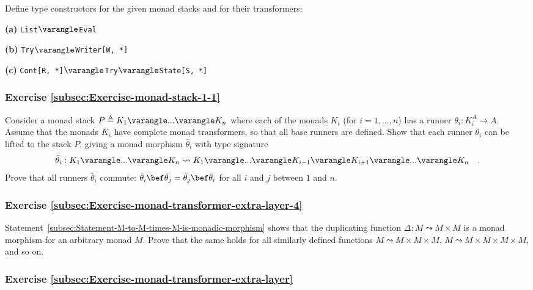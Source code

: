 Define type constructors for the given monad stacks and for their
transformers:

\textbf{(a)} \lstinline!List!$\varangle$\lstinline!Eval!

\textbf{(b)} \lstinline!Try!$\varangle$\lstinline!Writer[W, *]!

\textbf{(c)} \lstinline!Cont[R, *]!$\varangle$\lstinline!Try!$\varangle$\lstinline!State[S, *]!

\subsubsection{Exercise \label{subsec:Exercise-monad-stack-1-1}\ref{subsec:Exercise-monad-stack-1-1}}

Consider a monad stack $P\triangleq K_{1}\varangle...\varangle K_{n}$
where each of the monads $K_{i}$ (for $i=1,...,n$) has a runner
$\theta_{i}:K_{i}^{A}\rightarrow A$. Assume that the monads $K_{i}$
have complete monad transformers, so that all base runners are defined.
Show that each runner $\theta_{i}$ can be lifted to the stack $P$,
giving a monad morphism $\bar{\theta}_{i}$ with type signature
\[
\bar{\theta}_{i}:K_{1}\varangle...\varangle K_{n}\leadsto K_{1}\varangle...\varangle K_{i-1}\varangle K_{i+1}\varangle...\varangle K_{n}\quad.
\]
Prove that all runners $\bar{\theta}_{i}$ commute: $\bar{\theta}_{i}\bef\bar{\theta}_{j}=\bar{\theta}_{j}\bef\bar{\theta}_{i}$
for all $i$ and $j$ between $1$ and $n$.

\subsubsection{Exercise \label{subsec:Exercise-monad-transformer-extra-layer-4}\ref{subsec:Exercise-monad-transformer-extra-layer-4} }

Statement~\ref{subsec:Statement-M-to-M-times-M-is-monadic-morphism}
shows that the duplicating function $\Delta:M\leadsto M\times M$
is a monad morphism for an arbitrary monad $M$. Prove that the same
holds for all similarly defined functions $M\leadsto M\times M\times M$,
$M\leadsto M\times M\times M\times M$, and so on.

\subsubsection{Exercise \label{subsec:Exercise-monad-transformer-extra-layer}\ref{subsec:Exercise-monad-transformer-extra-layer} }

